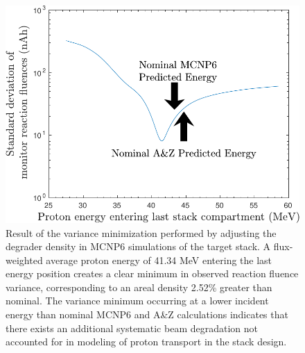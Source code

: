 \begin{figure}
 \centering
 \includegraphics[width=0.5\linewidth]{./figures/variation_curve-crop.pdf}

 \caption{Result of the variance minimization performed by adjusting the degrader density in MCNP6 simulations of the target stack.  A flux-weighted average proton energy of 41.34 MeV entering the last energy position creates a clear minimum in observed reaction fluence variance, corresponding to an areal density 2.52\% greater than nominal. The variance minimum occurring at a lower incident energy than nominal MCNP6 and A\&Z calculations indicates that there exists an additional systematic beam degradation not accounted for in modeling of proton transport in the stack design.}
 \label{fig:variation_curve}
\end{figure}


